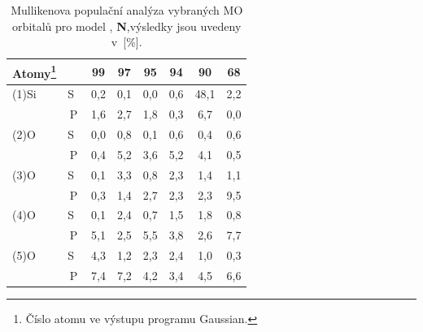 \documentclass[
digital, %
table,   %
nolof,     %
nolot,     %
oneside,
]{fithesis3}
\begin{document}
\begin{table}[H]\begin{minipage}{\textwidth}
\caption{Mullikenova populační analýza vybraných MO orbitalů pro model , \textbf{N},výsledky jsou uvedeny v~[\%].}
\begin{center}
\begin{tabular}{|l|c|c|c|c|c|c|c|}
\hline
Atomy\footnote{Číslo atomu ve výstupu programu Gaussian.}  \label{si_model_orezany_MPA} &  & 99 & 97 & 95 & 94 & 90 & 68 \\ \hline
(1)Si & S~& 0,2  & 0,1  & 0,0  & 0,6  & 48,1  & 2,2  \\ \hline
& P & 1,6  & 2,7  & 1,8  & 0,3  & 6,7  & 0,0  \\ \hline
(2)O & S~& 0,0  & 0,8  & 0,1  & 0,6  & 0,4  & 0,6  \\ \hline
& P & 0,4  & 5,2  & 3,6  & 5,2  & 4,1  & 0,5  \\ \hline
(3)O & S~& 0,1  & 3,3  & 0,8  & 2,3  & 1,4  & 1,1  \\ \hline
& P & 0,3  & 1,4  & 2,7  & 2,3  & 2,3  & 9,5  \\ \hline
(4)O & S~& 0,1  & 2,4  & 0,7  & 1,5  & 1,8  & 0,8  \\ \hline
& P & 5,1  & 2,5  & 5,5  & 3,8  & 2,6  & 7,7  \\ \hline
(5)O & S~& 4,3  & 1,2  & 2,3  & 2,4  & 1,0  & 0,3  \\ \hline
& P & 7,4  & 7,2  & 4,2  & 3,4  & 4,5  & 6,6 \\ \hline
\end{tabular}
\end{center}\end{minipage}\end{table}
\end{document}
